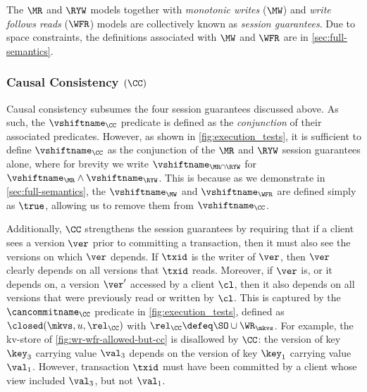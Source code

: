 The \(\MR\) and \(\RYW\) models together with \emph{monotonic writes} (\(\MW\)) and \emph{write follows reads} (\(\WFR\)) models  are collectively known as \emph{session guarantees}. 
Due to space constraints, the definitions associated with \(\MW\) and \(\WFR\) are in \cref{sec:full-semantics}. 



\subsubsection{Causal Consistency \((\CC)\)}
Causal consistency subsumes the  four session guarantees discussed above. 
As such, the \(\vshiftname_\CC\) predicate is defined as the \emph{conjunction} of their associated \vshiftname predicates.
However, as shown in  \cref{fig:execution_tests}, it is sufficient to define \(\vshiftname_\CC\)
as the conjunction of the \(\MR\) and \(\RYW\) session guarantees alone, where for brevity we 
write \(\vshiftname_{\MR \cap \RYW}\) for  \(\vshiftname_{\MR} \land \vshiftname_{\RYW}\).
This is because 
as we demonstrate in \cref{sec:full-semantics},
the \(\vshiftname_{\MW}\) and \(\vshiftname_{\WFR}\) are defined simply as \( \true \), allowing us to remove them from \(\vshiftname_{\CC}\).

Additionally, \(\CC\) strengthens the session guarantees by requiring that if a client sees a version \(\ver\) prior to committing a transaction, then it must also see the versions 
on which \(\ver\) depends.
If \(\txid\) is the writer of \(\ver\), then 
\(\ver\) clearly depends on all versions that \(\txid\) reads. 
Moreover, if \(\ver\) is, or it depends on, a version \(\ver'\) accessed by 
a client \(\cl\), then it also depends on all versions that were previously 
read or written by \(\cl\). 
This is captured by the \(\cancommitname_{\CC}\) predicate in \cref{fig:execution_tests}, 
defined as \(\closed(\mkvs, u, \rel_{\CC})\) with \(\rel_\CC \defeq \SO \cup \WR_{\mkvs}\).
For example, the kv-store of \cref{fig:wr-wfr-allowed-but-cc} 
is disallowed by \(\CC\): the version of key \(\key_3\) carrying value \(\val_3\) depends on the version of key \(\key_1\) carrying value \(\val_1\). However, transaction \(\txid\) must have been committed by a client whose view included \(\val_3\), but not \(\val_1\).

